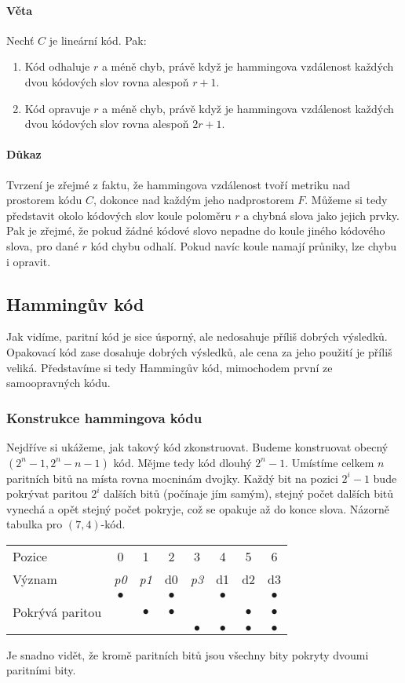 \documentclass[a4paper,12pt]{article}
\begin{document}
\paragraph{Věta}
Nechť $C$ je lineární kód. Pak:
\begin{enumerate}
	\item Kód odhaluje $r$ a méně chyb, právě když je hammingova vzdálenost 
	každých dvou kódových slov rovna alespoň $r+1$.
	\item Kód opravuje $r$ a méně chyb, právě když je hammingova vzdálenost 
	každých dvou kódových slov rovna alespoň $2r+1$.
\end{enumerate}
\paragraph{Důkaz}
Tvrzení je zřejmé z faktu, že hammingova vzdálenost tvoří metriku nad prostorem 
kódu $C$, dokonce nad každým jeho nadprostorem $F$. Můžeme si tedy představit 
okolo kódových slov koule poloměru $r$ a chybná slova jako jejich prvky. Pak je 
zřejmé, že pokud žádné kódové slovo nepadne do koule jiného kódového slova, pro 
dané $r$ kód chybu odhalí. Pokud navíc koule namají průniky, lze chybu i 
opravit.

\subsection{Hammingův kód}
Jak vidíme, paritní kód je sice úsporný, ale nedosahuje příliš dobrých výsledků.  
Opakovací kód zase dosahuje dobrých výsledků, ale cena za jeho použití je příliš 
veliká. Představíme si tedy Hammingův kód, mimochodem první ze samoopravných 
kódu.
\subsubsection{Konstrukce hammingova kódu}
Nejdříve si ukážeme, jak takový kód zkonstruovat. Budeme konstruovat obecný 
$(2^n - 1, 2^n - n - 1)$ kód. Mějme tedy kód dlouhý $2^n-1$. Umístíme celkem $n$ 
paritních bitů na místa rovna mocninám dvojky. Každý bit na pozici $2^i-1$ bude 
pokrývat paritou $2^i$ dalších bitů (počínaje jím samým), stejný počet dalších 
bitů vynechá a opět stejný počet pokryje, což se opakuje až do konce slova.  
Názorně tabulka pro $(7,4)$-kód.
\vskip12pt
\begin{center}
\begin{tabular}{|l|c|c|c|c|c|c|c|}
\hline
	Pozice & 0 & 1 & 2 & 3 & 4 & 5 & 6 \\
	Význam & \textit{p0} & \textit{p1} & d0 & \textit{p3} & d1 & d2 & d3 \\
\hline
	& $\bullet$ & & $\bullet$ & & $\bullet$ & & $\bullet$\\
	Pokrývá paritou
	& & $\bullet$ & $\bullet$ & & & $\bullet$ & $\bullet$ \\
	& & & & $\bullet$ & $\bullet$ & $\bullet$ & $\bullet$ \\
	\hline
\end{tabular}
\end{center}
\vskip12pt
Je snadno vidět, že kromě paritních bitů jsou všechny bity pokryty dvoumi 
paritními bity.
\end{document}

